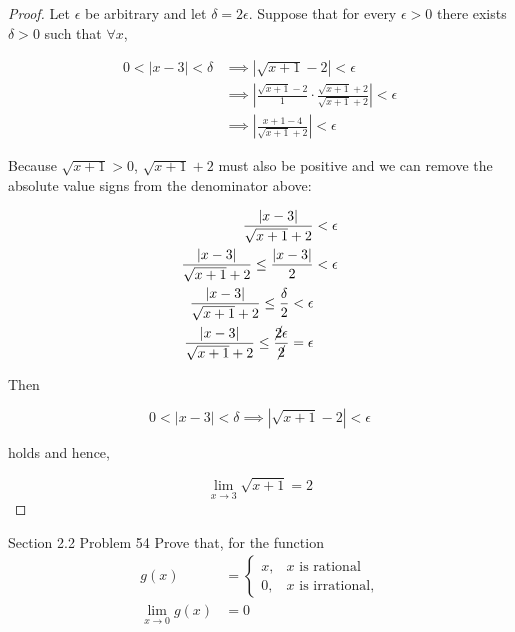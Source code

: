 \documentclass{article}
\begin{document}
    \begin{proof}
        Let $\epsilon$ be arbitrary and let $\delta = 2\epsilon$. Suppose that for every $\epsilon > 0$ there exists $\delta > 0$ such that $\forall x$,

        \begin{align*}
            0 < |x-3| < \delta          & \implies |\sqrt{x+1} - 2| < \epsilon \\
                                        & \implies \left|\frac{\sqrt{x+1}-2}{1}\cdot \frac{\sqrt{x+1}+2}{\sqrt{x+1}+2}\right| < \epsilon \\
                                        & \implies \left|\frac{x+1-4}{\sqrt{x+1}+2}\right| < \epsilon
        \end{align*}

        Because $\sqrt{x+1}>0$, $\sqrt{x+1}+2$ must also be positive and we can remove the absolute value signs from the denominator above:

        \begin{align*}
            \frac{|x-3|}{\sqrt{x+1}+2} &< \epsilon \\
            \frac{|x-3|}{\sqrt{x+1}+2} \leq \frac{|x-3|}{2} &< \epsilon \\
            \frac{|x-3|}{\sqrt{x+1}+2} \leq \frac{\delta}{2} < \epsilon \\
            \frac{|x-3|}{\sqrt{x+1}+2} \leq \frac{\cancel{2}\epsilon}{\cancel{2}} = \epsilon
        \end{align*}

        Then

        \[
            0 < |x-3| < \delta \implies |\sqrt{x+1}-2| < \epsilon
        \]

        holds and hence,

        \[
            \lim_{x\to 3} \sqrt{x+1} = 2
        \]
    \end{proof}

    \begin{tbhtheorem}{Section 2.2 Problem 54}
        Prove that, for the function
        \begin{align*}
            g(x) &=
            \begin{cases}
                x,  & x \text{ is rational} \\
                0,  & x \text{ is irrational,}
            \end{cases}
            \\
            \lim_{x\to 0} g(x) &= 0
        \end{align*}
    \end{tbhtheorem}
\end{document}

